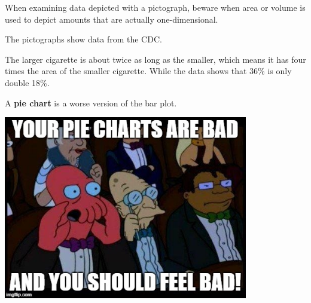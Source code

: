 \documentclass[handout]{beamer}
\begin{document}
\begin{frame}
\begin{note}
When examining data depicted with a pictograph, beware when area or volume is used to depict amounts that are actually one-dimensional.
\end{note}\pause

\begin{example}
The pictographs show data from the CDC\@.

\vspace{-7mm}
\begin{figure}
\centering
\hfill
{}
\hfill
{}
\hfill
\end{figure}
The larger cigarette is about twice as long as the smaller, which means it has four times the area of the smaller cigarette. While the data shows that 36\% is only double 18\%.
\end{example}
\end{frame}

\begin{frame}
\begin{definition}
A \textbf{pie chart} is a worse version of the bar plot.
\begin{center}
\includegraphics[width=0.8\textwidth]{zoidberg.jpg}
\end{center}
\end{definition}
\end{frame}
\end{document}
